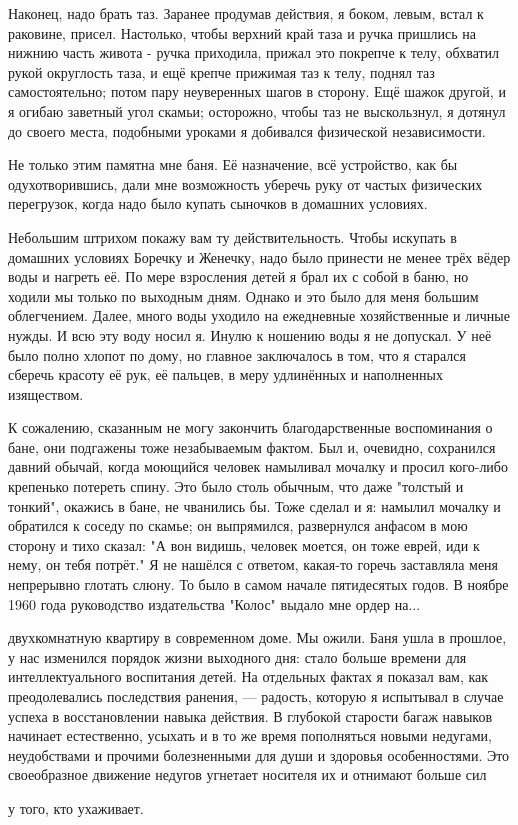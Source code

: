 \label{281-1}
Наконец, надо брать таз.  Заранее продумав действия, я боком, левым, встал к раковине, присел. Настолько, чтобы верхний край таза и ручка пришлись на нижнию часть живота - ручка приходила, прижал это покрепче к телу, обхватил рукой округлость таза, и ещё крепче прижимая таз к телу, поднял таз самостоятельно; потом пару неуверенных шагов в сторону. Ещё шажок другой, и я огибаю заветный угол скамьи; осторожно, чтобы таз не выскользнул, я дотянул до своего места, подобными уроками я добивался физической независимости.

Не только этим памятна мне баня. Её назначение, всё устройство, как бы одухотворившись, дали мне возможность уберечь руку от частых физических перегрузок, когда надо было купать сыночков в домашних условиях.

\label{282-1}
Небольшим штрихом покажу вам ту действительность. Чтобы искупать в домашних условиях Боречку и Женечку, надо было принести не менее трёх вёдер воды и нагреть её. По мере взросления детей я брал их с собой в баню, но ходили мы только по выходным дням. Однако и это было для меня большим облегчением. Далее, много воды уходило на ежедневные хозяйственные и личные нужды. И всю эту воду носил я. Инулю к ношению воды я не допускал. У неё было полно хлопот по дому, но главное заключалось в том, что я старался сберечь красоту её рук, её пальцев, в меру удлинённых и наполненных изяществом.

\label{283-1}
К сожалению, сказанным не могу закончить благодарственные воспоминания о бане, они подгажены тоже незабываемым фактом. Был и, очевидно, сохранился давний обычай, когда моющийся человек намыливал мочалку и просил кого-либо крепенько потереть спину. Это было столь обычным, что даже "толстый и тонкий", окажись в бане, не чванились бы. Тоже сделал и я: намылил мочалку и обратился к соседу по скамье; он выпрямился, развернулся анфасом в мою сторону и тихо сказал: "А вон видишь, человек моется, он тоже еврей, иди к нему, он тебя потрёт." Я не нашёлся с ответом, какая-то горечь заставляла меня непрерывно глотать слюну. То было в самом начале пятидесятых годов. В ноябре 1960 года руководство издательства "Колос" выдало мне ордер на...

\label{284-1}
двухкомнатную квартиру в современном доме. Мы ожили. Баня ушла в прошлое, у нас изменился порядок жизни выходного дня: стало больше времени для интеллектуального воспитания детей. На отдельных фактах я показал вам, как преодолевались последствия ранения, — радость, которую я испытывал в случае успеха в восстановлении навыка действия. В глубокой старости багаж навыков начинает естественно, усыхать и в то же время пополняться новыми недугами, неудобствами и прочими болезненными для души и здоровья особенностями. Это своеобразное движение недугов угнетает носителя их и отнимают больше сил

\label{285-1}
у того, кто ухаживает.
